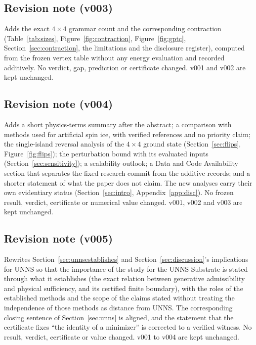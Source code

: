 \documentclass[11pt,a4paper]{article}
\theoremstyle{plain}
\theoremstyle{definition}
\theoremstyle{remark}
\begin{document}
\subsection{Revision note (v003)}
Adds the exact $4\times4$ grammar count and the corresponding contraction (Table~\ref{tab:sizes}, Figure~\ref{fig:contraction}, Figure~\ref{fig:gptc}, Section~\ref{sec:contraction}, the limitations and the disclosure register), computed from the frozen vertex table without any energy evaluation and recorded additively. No verdict, gap, prediction or certificate changed. v001 and v002 are kept unchanged.

\subsection{Revision note (v004)}
Adds a short physics-terms summary after the abstract; a comparison with methods used for artificial spin ice, with verified references and no priority claim; the single-island reversal analysis of the $4\times4$ ground state (Section~\ref{sec:flips}, Figure~\ref{fig:flips}); the perturbation bound with its evaluated inputs (Section~\ref{sec:sensitivity}); a scalability outlook; a Data and Code Availability section that separates the fixed research commit from the additive records; and a shorter statement of what the paper does not claim. The new analyses carry their own evidentiary status (Section~\ref{sec:intro}, Appendix~\ref{app:disc}). No frozen result, verdict, certificate or numerical value changed. v001, v002 and v003 are kept unchanged.

\subsection{Revision note (v005)}
Rewrites Section~\ref{sec:unnsestablishes} and Section~\ref{sec:discussion}'s implications for UNNS so that the importance of the study for the UNNS Substrate is stated through what it establishes (the exact relation between generative admissibility and physical sufficiency, and its certified finite boundary), with the roles of the established methods and the scope of the claims stated without treating the independence of those methods as distance from UNNS. The corresponding closing sentence of Section~\ref{sec:unns} is aligned, and the statement that the certificate fixes ``the identity of a minimizer'' is corrected to a verified witness. No result, verdict, certificate or value changed. v001 to v004 are kept unchanged.
\end{document}
